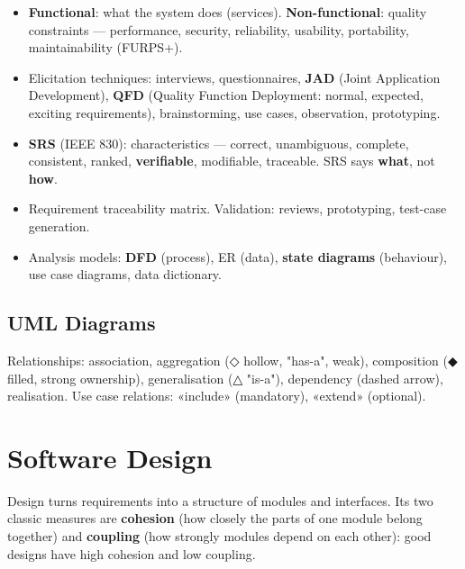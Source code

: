 

\begin{itemize}
\tightlist
\item
  \textbf{Functional}: what the system does (services). \textbf{Non-functional}: quality constraints --- performance, security, reliability, usability, portability, maintainability (FURPS+).
\item
  Elicitation techniques: interviews, questionnaires, \textbf{JAD} (Joint Application Development), \textbf{QFD} (Quality Function Deployment: normal, expected, exciting requirements), brainstorming, use cases, observation, prototyping.
\item
  \textbf{SRS} (IEEE 830): characteristics --- correct, unambiguous, complete, consistent, ranked, \textbf{verifiable}, modifiable, traceable. SRS says \textbf{what}, not \textbf{how}.
\item
  Requirement traceability matrix. Validation: reviews, prototyping, test-case generation.
\item
  Analysis models: \textbf{DFD} (process), ER (data), \textbf{state diagrams} (behaviour), use case diagrams, data dictionary.
\end{itemize}



\needspace{95pt}

\hypertarget{p2-06--uml-diagrams}{%
\subsection{UML Diagrams}\label{p2-06--uml-diagrams}}



Relationships: association, aggregation (◇ hollow, "has-a", weak), composition (◆ filled, strong ownership), generalisation (△ "is-a"), dependency (dashed arrow), realisation. Use case relations: «include» (mandatory), «extend» (optional).

\needspace{227pt}

\hypertarget{p2-06--3-software-design}{%
\section{Software Design}\label{p2-06--3-software-design}}

Design turns requirements into a structure of modules and interfaces. Its two classic measures are
\textbf{cohesion} (how closely the parts of one module belong together) and \textbf{coupling} (how strongly modules
depend on each other): good designs have high cohesion and low coupling.


